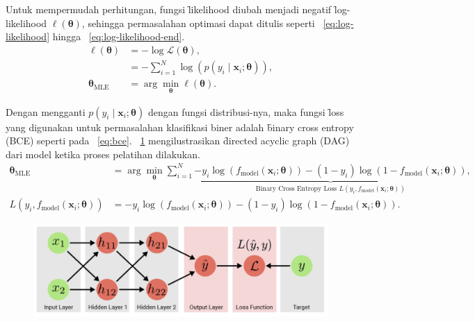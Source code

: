     Untuk mempermudah perhitungan, fungsi \f{likelihood} diubah menjadi negatif \f{log-likelihood} $\mathcal{\ell}(\bm{\theta})$, sehingga permasalahan optimasi dapat ditulis seperti \equ~\ref{eq:log-likelihood} hingga \equ~\ref{eq:log-likelihood-end}.
    \begin{align}
        \label{eq:log-likelihood}
        \ell{(\bm{\theta})} &= -\log\mathcal{L}(\bm{\theta}), \\
        &= -\sum_{i=1}^N \log\left(p(y_i \mid \mathbf{x}_i; \bm{\theta})\right), \\
        \label{eq:log-likelihood-end}
        \bm{\theta}_{\text{MLE}} &= \arg\min_{\bm{\theta}} \ell(\bm{\theta}).
    \end{align} 

    Dengan mengganti $p(y_i \mid \mathbf{x}_i; \bm{\theta})$ dengan fungsi distribusi-nya, maka fungsi \f{loss} yang digunakan untuk permasalahan klasifikasi biner adalah \f{binary cross entropy} (BCE) seperti pada \equ~\ref{eq:bce}. \pic~\ref{fig:dl-training-graph-dag} mengilustrasikan \f{directed acyclic graph} (DAG) dari model ketika proses pelatihan dilakukan.
    \begin{align}
        \bm{\theta}_{\text{MLE}} &= \arg\min_{\bm{\theta}}\sum_{i=1}^{N}\underbrace{-y_i \log\left(f_{\text{model}}(\mathbf{x}_i; \bm{\theta})\right) - (1 - y_i) \log\left(1 - f_{\text{model}}(\mathbf{x}_i; \bm{\theta})\right)}_{\text{Binary Cross Entropy Loss } L(y_i, f_{\text{model}}(\mathbf{x}_i; \bm{\theta}))}, \\
        \label{eq:bce} 
        L(y_i, f_{\text{model}}(\mathbf{x}_i; \bm{\theta})) &= -y_i \log\left(f_{\text{model}}(\mathbf{x}_i; \bm{\theta})\right) - (1 - y_i) \log\left(1 - f_{\text{model}}(\mathbf{x}_i; \bm{\theta})\right).
    \end{align}
    \begin{figure}[!ht]
        \centering
        \includegraphics[width=1\textwidth]{assets/pics/dl-training-graph.png}
        \label{fig:dl-training-graph-dag}
    \end{figure}

